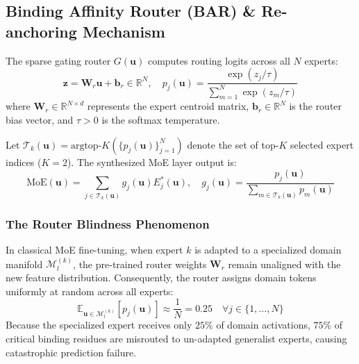 \documentclass{article}
\theoremstyle{definition}
\begin{document}
\subsection{Binding Affinity Router (BAR) \& Re-anchoring Mechanism}
The sparse gating router $G(\mathbf{u})$ computes routing logits across all $N$ experts:
\begin{equation}
\mathbf{z} = \mathbf{W}_r \mathbf{u} + \mathbf{b}_r \in \mathbb{R}^N, \quad p_j(\mathbf{u}) = \frac{\exp(z_j / \tau)}{\sum_{m=1}^N \exp(z_m / \tau)}
\end{equation}
where $\mathbf{W}_r \in \mathbb{R}^{N \times d}$ represents the expert centroid matrix, $\mathbf{b}_r \in \mathbb{R}^N$ is the router bias vector, and $\tau > 0$ is the softmax temperature.

Let $\mathcal{T}_k(\mathbf{u}) = \text{argtop-}K(\{p_j(\mathbf{u})\}_{j=1}^N)$ denote the set of top-$K$ selected expert indices ($K = 2$). The synthesized MoE layer output is:
\begin{equation}
\text{MoE}(\mathbf{u}) = \sum_{j \in \mathcal{T}_k(\mathbf{u})} g_j(\mathbf{u}) E_j^*(\mathbf{u}), \quad g_j(\mathbf{u}) = \frac{p_j(\mathbf{u})}{\sum_{m \in \mathcal{T}_k(\mathbf{u})} p_m(\mathbf{u})}
\end{equation}

\subsubsection{The Router Blindness Phenomenon}
In classical MoE fine-tuning, when expert $k$ is adapted to a specialized domain manifold $\mathcal{M}_l^{(k)}$, the pre-trained router weights $\mathbf{W}_r$ remain unaligned with the new feature distribution. Consequently, the router assigns domain tokens uniformly at random across all experts:
\begin{equation}
\mathbb{E}_{\mathbf{u} \in \mathcal{M}_l^{(k)}} [p_j(\mathbf{u})] \approx \frac{1}{N} = 0.25 \quad \forall j \in \{1, \dots, N\}
\end{equation}
Because the specialized expert receives only $25\%$ of domain activations, $75\%$ of critical binding residues are misrouted to un-adapted generalist experts, causing catastrophic prediction failure.
\end{document}
